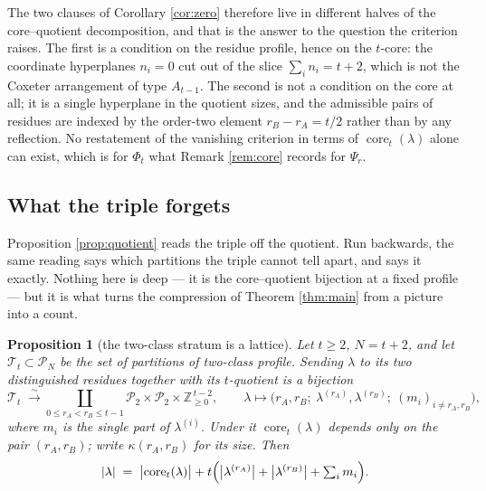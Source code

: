 \documentclass[11pt,reqno]{amsart}
\theoremstyle{plain}
\newtheorem{proposition}[theorem]{Proposition}
\theoremstyle{definition}
\newcommand{\ZZ}{\mathbb{Z}}
\newcommand{\PP}{\mathcal{P}}
\newcommand{\core}{\operatorname{core}}
\begin{document}
The two clauses of Corollary \ref{cor:zero} therefore live in different halves of the
core--quotient decomposition, and that is the answer to the question the criterion raises. The first
is a condition on the residue profile, hence on the $t$-core: the coordinate hyperplanes $n_i=0$ cut
out of the slice $\sum_i n_i=t+2$, which is not the Coxeter arrangement of type $A_{t-1}$. The
second is not a condition on the core at all; it is a single hyperplane in the quotient sizes, and
the admissible pairs of residues are indexed by the order-two element $r_B-r_A=t/2$ rather than by
any reflection. No restatement of the vanishing criterion in terms of $\core_t(\lambda)$ alone can
exist, which is for $\Phi_t$ what Remark \ref{rem:core} records for $\Psi_r$.

\subsection{What the triple forgets}\label{sec:fibrelattice}
Proposition \ref{prop:quotient} reads the triple off the quotient. Run backwards, the same reading
says which partitions the triple cannot tell apart, and says it exactly. Nothing here is deep --- it
is the core--quotient bijection at a fixed profile --- but it is what turns the compression of
Theorem \ref{thm:main} from a picture into a count.

\begin{proposition}[the two-class stratum is a lattice]\label{prop:fibrelattice}
Let $t\ge2$, $N=t+2$, and let $\mathcal{T}_t\subset\PP_N$ be the set of partitions of two-class
profile. Sending $\lambda$ to its two distinguished residues together with its $t$-quotient is a
bijection
\begin{equation}\label{eq:fibrelattice}
\mathcal{T}_t\;\xrightarrow{\ \sim\ }\!\!\!\coprod_{0\le r_A<r_B\le t-1}\!\!\!
\PP_2\times\PP_2\times\ZZ_{\ge0}^{\,t-2},
\qquad
\lambda\longmapsto\bigl(r_A,r_B;\ \lambda^{(r_A)},\lambda^{(r_B)};\ (m_i)_{i\ne r_A,r_B}\bigr),
\end{equation}
where $m_i$ is the single part of $\lambda^{(i)}$. Under it $\core_t(\lambda)$ depends only on the
pair $(r_A,r_B)$; write $\kappa(r_A,r_B)$ for its size. Then
\begin{equation}\label{eq:sizelattice}
|\lambda|\;=\;\bigl|\core_t(\lambda)\bigr|
+t\Bigl(\bigl|\lambda^{(r_A)}\bigr|+\bigl|\lambda^{(r_B)}\bigr|+\textstyle\sum_i m_i\Bigr).
\end{equation}
\end{proposition}
\end{document}
